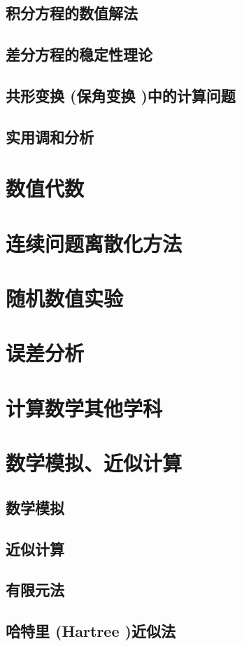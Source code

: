 \documentclass[UTF8]{../09-Mathematics}
\begin{document}
    \section{积分方程的数值解法}
    \section{差分方程的稳定性理论}
    \section{共形变换 (保角变换 )中的计算问题}
    \section{实用调和分析}



\chapter{数值代数}
\chapter{连续问题离散化方法}
\chapter{随机数值实验}
\chapter{误差分析}
\chapter{计算数学其他学科}



\chapter{数学模拟、近似计算}
\section{数学模拟}
\section{近似计算}
\section{有限元法}
\section{哈特里 (Hartree )近似法}
\end{document}
